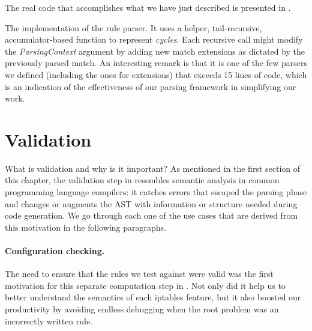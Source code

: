 The real code that accomplishes what we have just described is presented in
.

\begin{listing}[H]
  \caption{The implementation of the rule parser.  It uses a helper,
  tail-recursive, accumulator-based function to represent \emph{cycles}.  Each
  recursive call might modify the \emph{ParsingContext} argument by adding new
  match extensions as dictated by the previously parsed match.  An interesting
  remark is that it is one of the few parsers we defined (including the ones
  for extensions) that exceeds 15 lines of code, which is an indication of the
  effectiveness of our parsing framework in simplifying our work.}
  \label{lst:rule-parser}
\end{listing}


\section{Validation}

What is validation and why is it important?  As mentioned in the first section
of this chapter, the validation step in \TOOL resembles semantic analysis in
common programming language compilers: it catches errors that escaped the
parsing phase and changes or augments the AST with information or structure
needed during code generation.  We go through each one of the use cases that
are derived from this motivation in the following paragraphs.

\paragraph{Configuration checking.}
The need to ensure that the rules we test against were valid was the first
motivation for this separate computation step in \TOOL.  Not only did it help
us to better understand the semantics of each iptables feature, but it also
boosted our productivity by avoiding endless debugging when the root problem
was an incorrectly written rule.

